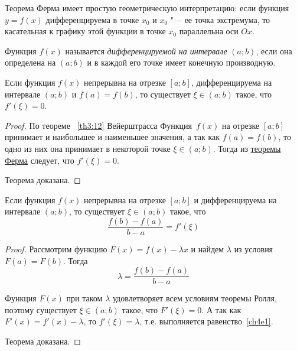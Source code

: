 \begin{notion}
Теорема Ферма имеет простую геометрическую интерпретацию: если функция $y = f(x)$ дифференцируема в точке $x_0$ и $x_0$ "--- ее точка экстремума, то касательная к графику этой функции в точке $x_0$ параллельна оси $Ox$. 
\end{notion}

\begin{defn}
Функция $f(x)$ называется \textit{дифференцируемой на интервале} $(a;b)$, если она определена на $(a;b)$ и в каждой его точке имеет конечную производную.
\end{defn}

\begin{thm}  Если функция $f(x)$ непрерывна на отрезке $[a; b]$, дифференцируема на интервале $(a; b)$ и $f(a) = f(b)$, то существует $\xi \in (a; b)$ такое, что $f'(\xi) = 0$.
\end{thm}
\begin{proof}
По теореме ~\ref{th3:12} {Вейерштрасса} Функция~$f(x)$ на отрезке $[a;b]$ принимает и наибольшее и наименьшее значения, а так как $f(a) = f(b)$, то одно из них она принимает в некоторой точке $\xi \in (a; b)$. Тогда из  \hyperref[ch4n1]{теоремы Ферма} следует, что $f'(\xi) = 0$.
 
Теорема доказана.
\end{proof}

\begin{thm}\label{ch4t1} Если функция $f(x)$ непрерывна на отрезке $[a; b]$ и дифференцируема на интервале $(a; b)$, то существует $\xi \in (a; b)$ такое, что
\begin{equation}\label{ch4e1}
\frac{f(b)-f(a)}{b-a}=f'(\xi)
\end{equation}
\end{thm}

\begin{proof} Рассмотрим функцию $F(x) = f(x) - \lambda x$ и найдем $\lambda$ из условия $F(a) = F(b)$. Тогда
\begin{equation}\label{ch4e2}
\lambda=\frac{f(b)-f(a)}{b-a}
\end{equation}

Функция $F(x)$ при таком $\lambda$ удовлетворяет всем условиям теоремы Ролля, поэтому существует $\xi \in (a; b)$ такое, что $F'(\xi) = 0$. А так как $F'(x) = f'(x) - \lambda$, то $f'(\xi) = \lambda$, т.е. выполняется равенство~\eqref{ch4e1}.
 
Теорема доказана.
\end{proof}

